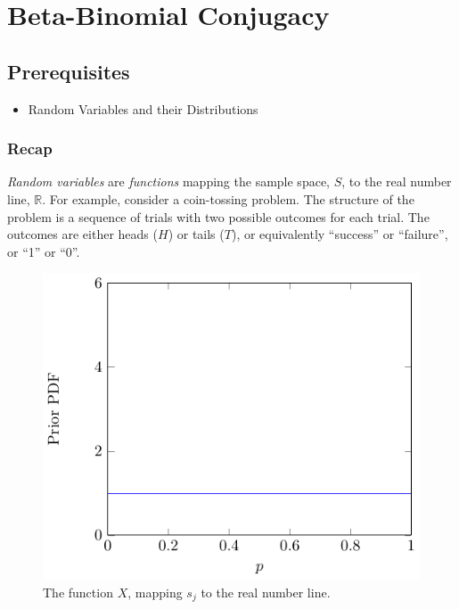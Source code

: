 


\maketitle
\clearpage

\section{Beta-Binomial Conjugacy}

\subsection{Prerequisites}

\begin{itemize}
\item
Random Variables and their Distributions
\end{itemize}

\subsubsection{Recap}

\emph{Random variables} are \emph{functions} 
mapping the sample space, \(S\), 
to the real number line, \(\mathbb{R}\). 
For example, 
consider a coin-tossing problem. 
The structure of the problem is a sequence of trials 
with two possible outcomes for each trial. 
The outcomes are either heads (\(H\)) or tails (\(T\)), 
or equivalently ``success'' or ``failure'', 
or ``1'' or ``0''.

\begin{figure}[h!]
\centering
\includegraphics[width=0.75\linewidth]{tikz/figure1}
\caption{The function \(X\), mapping \(s_{j}\) to the real number line.}
\label{fig:mapping}
\end{figure}

